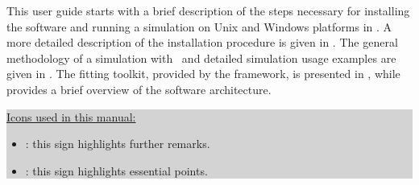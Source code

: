 


This user guide starts with a brief description of the steps necessary for 
installing the software and running a simulation 
on Unix and Windows platforms in .
A more detailed description of the installation procedure is given in .
The general methodology of a simulation with \BornAgain\ and detailed simulation usage examples are given in .
The fitting toolkit, provided by the framework, is presented in , while
 provides a brief overview of the software architecture.


\vspace*{2mm}

\colorbox{Lightgray}{\parbox{0.95\linewidth}
{
\noindent \underline{Icons used in this manual:}
\begin{itemize}
\item[] \smallpencil: this sign highlights further remarks.
\item[] {\huge\danger}: this sign highlights essential points.
\end{itemize}
}
}
